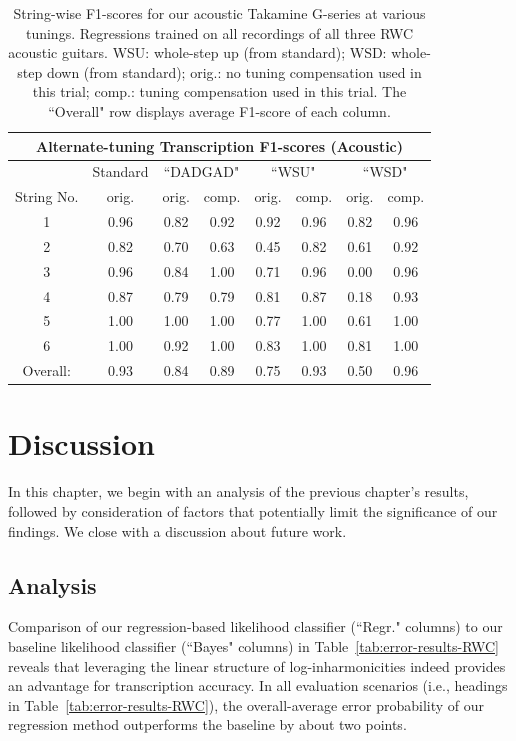 \documentclass[12pt]{cmuthesis}
\begin{document}
\begin{table}[!htbp]
\begin{center}
\begin{tabular}{||c||c||c|c||c|c||c|c||}
\hline
\multicolumn{8}{|c|}{\bf{Alternate-tuning Transcription F1-scores (Acoustic)}} \\
\hline
& Standard & \multicolumn{2}{|c|}{``DADGAD"} & \multicolumn{2}{|c|}{``WSU"} & \multicolumn{2}{|c|}{``WSD"} \\
\hline
String No. & orig. & orig. & comp. & orig. & comp. & orig. & comp. \\
\hline
1 & 0.96 & 0.82 & 0.92 & 0.92 & 0.96 & 0.82 & 0.96 \\
\hline
2 & 0.82 & 0.70 & 0.63 & 0.45 & 0.82 & 0.61 & 0.92\\
\hline
3 & 0.96 & 0.84 & 1.00 & 0.71 & 0.96 & 0.00 & 0.96\\
\hline
4 & 0.87 & 0.79 & 0.79 & 0.81 & 0.87 & 0.18 & 0.93 \\
\hline
5 & 1.00 & 1.00 & 1.00 & 0.77 & 1.00 & 0.61 & 1.00 \\
\hline
6 & 1.00 & 0.92 & 1.00 & 0.83 & 1.00 & 0.81 & 1.00\\ 
\hline
\hline
Overall: & 0.93 & 0.84 & 0.89 & 0.75 & 0.93 & 0.50 & 0.96\\
\hline
\end{tabular}
\caption{String-wise F1-scores for our acoustic Takamine G-series at various tunings. Regressions trained on all recordings of all three RWC acoustic guitars. WSU: whole-step up (from standard); WSD: whole-step down (from standard); orig.: no tuning compensation used in this trial; comp.: tuning compensation used in this trial. The ``Overall" row displays average F1-score of each column.} 
\label{tab:results-ag-tune}
\end{center}
\end{table}

\noindent
\chapter{Discussion}
\label{chap:discussion}
In this chapter, we begin with an analysis of the previous chapter's results, followed by consideration of factors that potentially limit the significance of our findings. We close with a discussion about future work.

\section{Analysis}
Comparison of our regression-based likelihood classifier (``Regr." columns) to our baseline likelihood classifier (``Bayes" columns) in Table~\ref{tab:error-results-RWC} reveals that leveraging the linear structure of log-inharmonicities indeed provides an advantage for transcription accuracy. In all evaluation scenarios (i.e., headings in Table~\ref{tab:error-results-RWC}), the overall-average error probability of our regression method outperforms the baseline by about two points.
\end{document}
